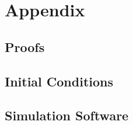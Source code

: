 \chapter{Appendix}

\section{Proofs}\label{app:proofs}


\section{Initial Conditions}


\section{Simulation Software}


